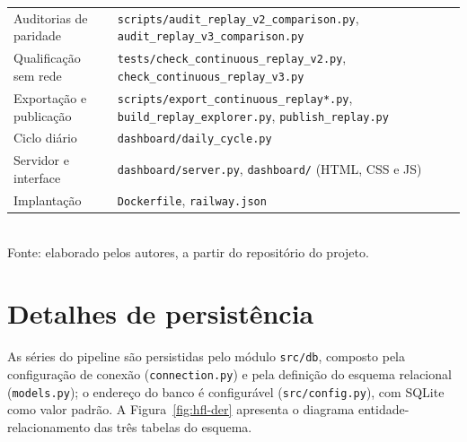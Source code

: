 \begin{table}[H]
\begin{tabular}{>{\raggedright\arraybackslash}p{4.0cm} >{\raggedright\arraybackslash}p{11.0cm}}
Auditorias de paridade & \texttt{scripts/audit\_replay\_v2\_comparison.py}, \texttt{audit\_replay\_v3\_comparison.py} \\
Qualificação sem rede & \texttt{tests/check\_continuous\_replay\_v2.py}, \texttt{check\_continuous\_replay\_v3.py} \\
Exportação e publicação & \texttt{scripts/export\_continuous\_replay*.py}, \texttt{build\_replay\_explorer.py}, \texttt{publish\_replay.py} \\
Ciclo diário & \texttt{dashboard/daily\_cycle.py} \\
Servidor e interface & \texttt{dashboard/server.py}, \texttt{dashboard/} (HTML, CSS e JS) \\
Implantação & \texttt{Dockerfile}, \texttt{railway.json} \\
\bottomrule
\end{tabular}
\\[2pt]
{\footnotesize Fonte: elaborado pelos autores, a partir do repositório do projeto.}
\end{table}

\section{Detalhes de persistência}

As séries do pipeline são persistidas pelo módulo \texttt{src/db}, composto pela configuração de conexão (\texttt{connection.py}) e pela definição do esquema relacional (\texttt{models.py}); o endereço do banco é configurável (\texttt{src/config.py}), com SQLite como valor padrão. A Figura~\ref{fig:hfl-der} apresenta o diagrama entidade-relacionamento das três tabelas do esquema.

